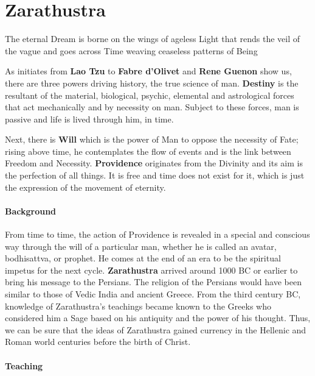 \section{Zarathustra}

\begin{quotex}
The eternal Dream is borne on the wings of ageless Light that rends the veil of the vague and goes across Time weaving ceaseless patterns of Being
\end{quotex}

As initiates from \textbf{Lao Tzu} to \textbf{Fabre d'Olivet} and \textbf{Rene Guenon} show us, there are three powers driving history, the true science of man. \textbf{Destiny} is the resultant of the material, biological, psychic, elemental and astrological forces that act mechanically and by necessity on man. Subject to these forces, man is passive and life is lived through him, in time.

Next, there is \textbf{Will} which is the power of Man to oppose the necessity of Fate; rising above time, he contemplates the flow of events and is the link between Freedom and Necessity. \textbf{Providence} originates from the Divinity and its aim is the perfection of all things. It is free and time does not exist for it, which is just the expression of the movement of eternity.

\paragraph{Background}


From time to time, the action of Providence is revealed in a special and conscious way through the will of a particular man, whether he is called an avatar, bodhisattva, or prophet. He comes at the end of an era to be the spiritual impetus for the next cycle. \textbf{Zarathustra} arrived around 1000 BC or earlier to bring his message to the Persians. The religion of the Persians would have been similar to those of Vedic India and ancient Greece. From the third century BC, knowledge of Zarathustra's teachings became known to the Greeks who considered him a Sage based on his antiquity and the power of his thought. Thus, we can be sure that the ideas of Zarathustra gained currency in the Hellenic and Roman world centuries before the birth of Christ.

\paragraph{Teaching}


